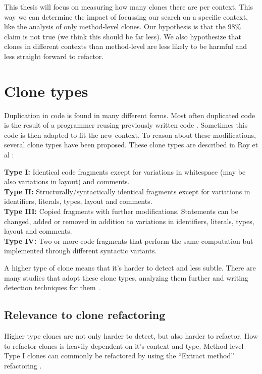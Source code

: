 \documentclass{report}
\theoremstyle{definition}
\theoremstyle{remark}
\begin{document}
This thesis will focus on measuring how many clones there are per context. This way we can determine the impact of focussing our search on a specific context, like the analysis of only method-level clones. Our hypothesis is that the 98\% claim is not true (we think this should be far less). We also hypothesize that clones in different contexts than method-level are less likely to be harmful and less straight forward to refactor. 

\section{Clone types}
Duplication in code is found in many different forms. Most often duplicated code is the result of a programmer reusing previously written code \cite{haefliger2008code, baxter1998clone}. Sometimes this code is then adapted to fit the new context. To reason about these modifications, several clone types have been proposed. These clone types are described in Roy et al \cite{roy2007survey}:
\begin{displayquote}
\textbf{Type I:} Identical code fragments except for variations in whitespace (may be also variations in layout) and comments.\\
\textbf{Type II:} Structurally/syntactically identical fragments except for variations in identifiers, literals, types, layout and comments.\\
\textbf{Type III:} Copied fragments with further modifications. Statements can be changed, added or removed in addition to variations in identifiers, literals, types, layout and comments.\\
\textbf{Type IV:} Two or more code fragments that perform the same computation but implemented through different syntactic variants.
\end{displayquote}
A higher type of clone means that it's harder to detect and less subtle. There are many studies that adopt these clone types, analyzing them further and writing detection techniques for them \cite{sajnani2016sourcerercc, kodhai2010detection, van2019novel}.

\subsection{Relevance to clone refactoring}
Higher type clones are not only harder to detect, but also harder to refactor. How to refactor clones is heavily dependent on it's context and type. Method-level Type I clones can commonly be refactored by using the ``Extract method'' refactoring \cite{kodhai2013method}.
\end{document}
